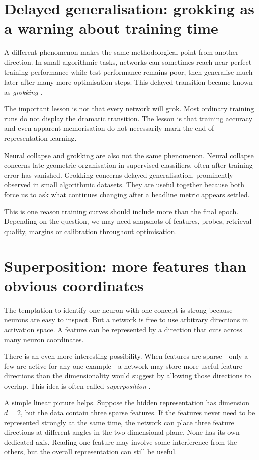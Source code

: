 \section{Delayed generalisation: grokking as a warning about training time}

A different phenomenon makes the same methodological point from another direction. In small algorithmic tasks, networks can sometimes reach near-perfect training performance while test performance remains poor, then generalise much later after many more optimisation steps. This delayed transition became known as \emph{grokking} \parencite{power2022}.

The important lesson is not that every network will grok. Most ordinary training runs do not display the dramatic transition. The lesson is that training accuracy and even apparent memorisation do not necessarily mark the end of representation learning.

Neural collapse and grokking are also not the same phenomenon. Neural collapse concerns late geometric organisation in supervised classifiers, often after training error has vanished. Grokking concerns delayed generalisation, prominently observed in small algorithmic datasets. They are useful together because both force us to ask what continues changing after a headline metric appears settled.

This is one reason training curves should include more than the final epoch. Depending on the question, we may need snapshots of features, probes, retrieval quality, margins or calibration throughout optimisation.

\section{Superposition: more features than obvious coordinates}

The temptation to identify one neuron with one concept is strong because neurons are easy to inspect. But a network is free to use arbitrary directions in activation space. A feature can be represented by a direction that cuts across many neuron coordinates.

There is an even more interesting possibility. When features are sparse---only a few are active for any one example---a network may store more useful feature directions than the dimensionality would suggest by allowing those directions to overlap. This idea is often called \emph{superposition} \parencite{elhage2022superposition}.

A simple linear picture helps. Suppose the hidden representation has dimension \(d=2\), but the data contain three sparse features. If the features never need to be represented strongly at the same time, the network can place three feature directions at different angles in the two-dimensional plane. None has its own dedicated axis. Reading one feature may involve some interference from the others, but the overall representation can still be useful.

